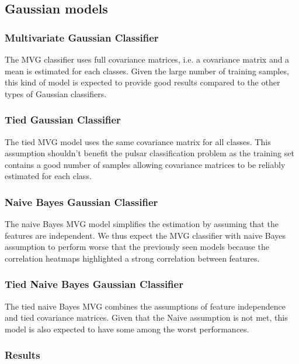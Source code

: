 \documentclass[12pt,a4paper]{article}
\begin{document}
\subsection{Gaussian models}

\subsubsection{Multivariate Gaussian Classifier}
The MVG classifier uses full covariance matrices, i.e. a covariance matrix and a mean is estimated for each classes.
Given the large number of training samples, this kind of model is expected to provide good results compared to the other types of Gaussian classifiers.

\subsubsection{Tied Gaussian Classifier}
The tied MVG model uses the same covariance matrix for all classes.
This assumption shouldn't benefit the pulsar classification problem as the training set contains a good number of samples allowing covariance matrices to be reliably estimated for each class.

\subsubsection{Naive Bayes Gaussian Classifier}
The naive Bayes MVG model simplifies the estimation by assuming that the features are independent.
We thus expect the MVG classifier with naive Bayes assumption to perform worse that the previously seen
models because the correlation heatmaps highlighted a strong correlation between features.

\subsubsection{Tied Naive Bayes Gaussian Classifier}
The tied naive Bayes MVG combines the assumptions of feature independence and tied covariance matrices.
Given that the Naive assumption is not met, this model is also expected to have some among the worst performances.

\clearpage

\subsubsection{Results}
\end{document}
